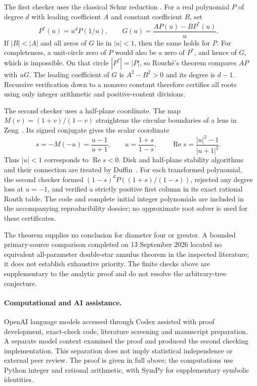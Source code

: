 \documentclass[11pt]{article}
\begin{document}
The first checker uses the classical Schur reduction
\cite{Duffin1969}. For a real polynomial $P$ of degree $d$ with leading
coefficient $A$ and constant coefficient $B$, set
\[
 P^*(u)=u^dP(1/u),\qquad G(u)=\frac{AP(u)-BP^*(u)}{u}.
\]
If $|B|<|A|$ and all zeros of $G$ lie in $|u|<1$, then the same holds
for $P$. For completeness, a unit-circle zero of $P$ would also be a
zero of $P^*$, and hence of $G$, which is impossible. On that circle
$|P^*|=|P|$, so Rouch\'e's theorem compares $AP$ with $uG$.
The leading coefficient of $G$ is $A^2-B^2>0$ and its degree is $d-1$.
Recursive verification down to a nonzero constant therefore certifies
all roots using only integer arithmetic and positive-content divisions.

The second checker uses a half-plane coordinate. The map
$M(v)=(1+v)/(1-v)$ straightens the circular boundaries of a lens
in Zeng~\cite{Zeng2026Lens}.
Its signed conjugate gives the scalar coordinate
\[
 s=-M(-u)=\frac{u-1}{u+1},\qquad
 u=\frac{1+s}{1-s},\qquad
 \operatorname{Re}s=\frac{|u|^2-1}{|u+1|^2}.
\]
Thus $|u|<1$ corresponds to $\operatorname{Re}s<0$.
Disk and half-plane stability algorithms and their connection are
treated by Duffin~\cite{Duffin1969}.
For each transformed polynomial, the second checker formed
$(1-s)^dP((1+s)/(1-s))$, rejected any degree loss at $u=-1$, and
verified a strictly positive first column in its exact rational Routh
table. The code and complete initial integer polynomials are included
in the accompanying reproducibility dossier; no approximate root
solver is used for these certificates.

The theorem supplies no conclusion for diameter four or greater.
A bounded primary-source comparison completed on 13 September 2026
located no equivalent all-parameter double-star annulus theorem in the
inspected literature; it does not establish exhaustive priority.
The finite checks above are supplementary to the analytic proof and
do not resolve the arbitrary-tree conjecture.

\paragraph{Computational and AI assistance.}
OpenAI language models accessed through Codex assisted with proof
development, exact-check code, literature screening and manuscript
preparation. A separate model context examined the proof and produced
the second checking implementation. This separation does not imply
statistical independence or external peer review. The proof is given
in full above; the computations use Python integer and rational
arithmetic, with SymPy for supplementary symbolic identities.



\end{document}
